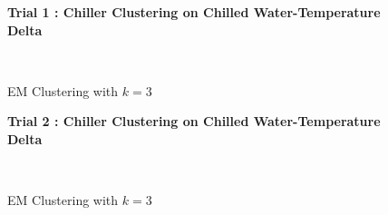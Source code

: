 \begin{figure}[!h]
\centerline{\bfseries\Large Trial 1 : Chiller Clustering on Chilled Water-Temperature Delta}\\
\caption{EM Clustering with $k=3$}
\end{figure}
\begin{figure}[!h]
\centerline{\bfseries\Large Trial 2 : Chiller Clustering on Chilled Water-Temperature Delta}\\
\caption{EM Clustering with $k=3$}
\end{figure}
